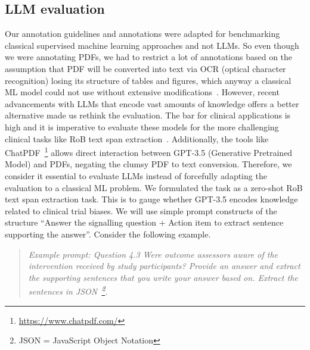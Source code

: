 \documentclass[sn-mathphys,Numbered]{sn-jnl}%
\theoremstyle{thmstyleone}%
\theoremstyle{thmstyletwo}%
\theoremstyle{thmstylethree}%
\begin{document}
\subsection{LLM evaluation}
\label{method:llm}
%
Our annotation guidelines and annotations were adapted for benchmarking classical supervised machine learning approaches and not LLMs.
So even though we were annotating PDFs, we had to restrict a lot of annotations based on the assumption that PDF will be converted into text via OCR (optical character recognition) losing its structure of tables and figures, which anyway a classical ML model could not use without extensive modifications~\cite{li2019figure,li2023uttsr}.
However, recent advancements with LLMs that encode vast amounts of knowledge offers a better alternative made us rethink the evaluation.
The bar for clinical applications is high and it is imperative to evaluate these models for the more challenging clinical tasks like RoB text span extraction~\cite{singhal2023large}.
Additionally, the tools like ChatPDF~\footnote{\url{https://www.chatpdf.com/}} allows direct interaction between GPT-3.5 (Generative Pretrained Model) and PDFs, negating the clumsy PDF to text conversion.
Therefore, we consider it essential to evaluate LLMs instead of forcefully adapting the evaluation to a classical ML problem.
We formulated the task as a zero-shot RoB text span extraction task.
This is to gauge whether GPT-3.5 encodes knowledge related to clinical trial biases.
We will use simple prompt constructs of the structure ``Answer the signalling question + Action item to extract sentence supporting the answer''. Consider the following example.

\begin{quote}
\itshape Example prompt: Question 4.3 Were outcome assessors aware of the intervention received by study participants? Provide an answer and extract the supporting sentences that you write your answer based on. Extract the sentences in JSON~\footnote{JSON = JavaScript Object Notation}.
\end{quote}
\end{document}
